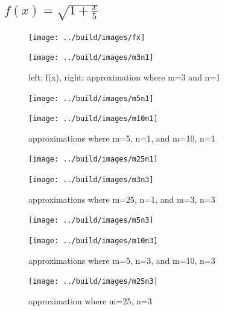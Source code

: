 \documentclass[11pt, a4paper, titlepage, openright]{article}
\begin{document}
	\subsection{\( f(x) = \sqrt{1 + \frac{x}{5}} \)}
	\label{sec:sqrtImages}
    \begin{figure}[H]
        \begin{minipage}[b]{0.49\textwidth}
            \texttt{[image: ../build/images/fx]}
        \end{minipage}
        \hfill
        \begin{minipage}[b]{0.49\textwidth}
            \texttt{[image: ../build/images/m3n1]}
        \end{minipage}
        \caption{left: f(x), right: approximation where m=3 and n=1}
        \label{fig:sqrt1}
    \end{figure}
    \begin{figure}[H]
        \begin{minipage}[b]{0.49\textwidth}
            \texttt{[image: ../build/images/m5n1]}
        \end{minipage}
        \hfill
        \begin{minipage}[b]{0.49\textwidth}
            \texttt{[image: ../build/images/m10n1]}
        \end{minipage}
        \caption{approximations where m=5, n=1, and m=10, n=1}
        \label{fig:sqrt1}
    \end{figure}
    \begin{figure}[H]
        \begin{minipage}[b]{0.49\textwidth}
            \texttt{[image: ../build/images/m25n1]}
        \end{minipage}
        \hfill
        \begin{minipage}[b]{0.49\textwidth}
            \texttt{[image: ../build/images/m3n3]}
        \end{minipage}
        \caption{approximations where m=25, n=1, and m=3, n=3}
        \label{fig:sqrt1}
    \end{figure}
    \begin{figure}[H]
        \begin{minipage}[b]{0.49\textwidth}
            \texttt{[image: ../build/images/m5n3]}
        \end{minipage}
        \hfill
        \begin{minipage}[b]{0.49\textwidth}
            \texttt{[image: ../build/images/m10n3]}
        \end{minipage}
        \caption{approximations where m=5, n=3, and m=10, n=3}
        \label{fig:sqrt1}
    \end{figure}
    \begin{figure}[H]
        \begin{minipage}[b]{0.49\textwidth}
            \texttt{[image: ../build/images/m25n3]}
        \end{minipage}
        \hfill
        \caption{approximation where m=25, n=3}
        \label{fig:sqrt1}
    \end{figure}
    
\end{document}
